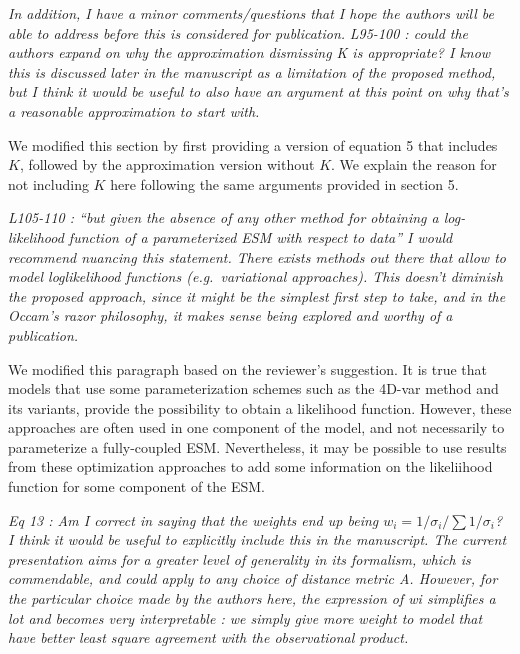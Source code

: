 \emph{In addition, I have a minor comments/questions that I hope the
authors will be able to address before this is considered for
publication.} \emph{L95-100 : could the authors expand on why the
approximation dismissing K is appropriate? I know this is discussed
later in the manuscript as a limitation of the proposed method, but I
think it would be useful to also have an argument at this point on why
that's a reasonable approximation to start with.}

We modified this section by first providing a version of equation 5 that
includes \(K\), followed by the approximation version without \(K\). We
explain the reason for not including \(K\) here following the same
arguments provided in section 5.

\emph{L105-110 : ``but given the absence of any other method for
obtaining a log-likelihood function of a parameterized ESM with respect
to data'' I would recommend nuancing this statement. There exists
methods out there that allow to model loglikelihood functions
(e.g.~variational approaches). This doesn't diminish the proposed
approach, since it might be the simplest first step to take, and in the
Occam's razor philosophy, it makes sense being explored and worthy of a
publication.}

We modified this paragraph based on the reviewer's suggestion. It is
true that models that use some parameterization schemes such as the
4D-var method and its variants, provide the possibility to obtain a
likelihood function. However, these approaches are often used in one
component of the model, and not necessarily to parameterize a
fully-coupled ESM. Nevertheless, it may be possible to use results from
these optimization approaches to add some information on the likeliihood
function for some component of the ESM.

\emph{Eq 13 : Am I correct in saying that the weights end up being
\(w_i = 1/\sigma_i / \sum 1/\sigma_i\)? I think it would be useful to
explicitly include this in the manuscript. The current presentation aims
for a greater level of generality in its formalism, which is
commendable, and could apply to any choice of distance metric A.
However, for the particular choice made by the authors here, the
expression of wi simplifies a lot and becomes very interpretable : we
simply give more weight to model that have better least square agreement
with the observational product.}

